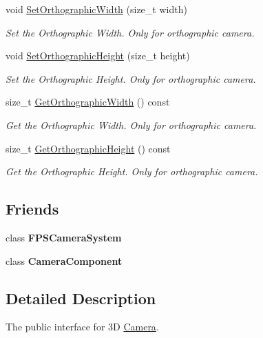 \begin{DoxyCompactItemize}
void \hyperlink{classCamera_aa4d72b13e178899c2bdb68652a8fd10a}{Set\+Orthographic\+Width} (size\+\_\+t width)
\begin{DoxyCompactList}\small\item\em Set the Orthographic Width. Only for orthographic camera. \end{DoxyCompactList}\item 
void \hyperlink{classCamera_a59239b01b73f2e6aeb482b32831aba2b}{Set\+Orthographic\+Height} (size\+\_\+t height)
\begin{DoxyCompactList}\small\item\em Set the Orthographic Height. Only for orthographic camera. \end{DoxyCompactList}\item 
size\+\_\+t \hyperlink{classCamera_a247797f293fc7e2aa7529c3ad0ea4739}{Get\+Orthographic\+Width} () const
\begin{DoxyCompactList}\small\item\em Get the Orthographic Width. Only for orthographic camera. \end{DoxyCompactList}\item 
size\+\_\+t \hyperlink{classCamera_a12110e195967b52900768e4e008c7d63}{Get\+Orthographic\+Height} () const
\begin{DoxyCompactList}\small\item\em Get the Orthographic Height. Only for orthographic camera. \end{DoxyCompactList}\end{DoxyCompactItemize}
\subsection*{Friends}
\begin{DoxyCompactItemize}
\item 
\mbox{\label{classCamera_ad7590dd71ff942ecb6f2926afddaafbe}} 
class {\bfseries F\+P\+S\+Camera\+System}
\item 
\mbox{\label{classCamera_ae834a5e62eff7d0adb1092a0693388f7}} 
class {\bfseries Camera\+Component}
\end{DoxyCompactItemize}


\subsection{Detailed Description}
The public interface for 3D \hyperlink{classCamera}{Camera}. 

